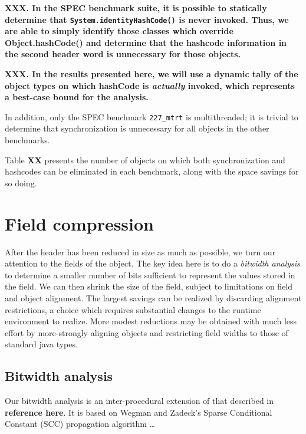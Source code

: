 \documentclass[preprint]{acmconf}
\begin{document}
{\bf XXX.  In the SPEC benchmark suite, it is possible to statically
  determine that {\tt System.identityHashCode()} is never invoked.
  Thus, we are able to simply identify those classes which override
  Object.hashCode() and determine that the hashcode information in the
  second header word is unnecessary for those objects.}

{\bf XXX. In the results presented here, we will use a dynamic tally
of the object types on which hashCode is {\it actually} invoked, which
represents a best-case bound for the analysis.}

In addition, only the SPEC benchmark {\tt 227\_mtrt} is multithreaded;
it is trivial to determine that synchronization is unnecessary for all
objects in the other benchmarks.

Table {\bf XX} presents the number of objects on which both
synchronization and hashcodes can be eliminated in each benchmark,
along with the space savings for so doing.

\section{Field compression}
After the header has been reduced in size as much as possible, we turn
our attention to the fields of the object.  The key idea here is to
do a {\it bitwidth analysis} \cite{stephenson00,ananian99:tech}
to determine a
smaller number of bits sufficient to represent the values stored in
the field.  We can then shrink the size of the field, subject to
limitations on field and object alignment.  The largest savings can be
realized by discarding alignment restrictions, a choice which requires
substantial changes to the runtime environment to realize.  More
modest reductions may be obtained with much less effort by
more-strongly aligning objects and restricting field widths to
those of standard java types.

\subsection{Bitwidth analysis}
Our bitwidth analysis is an inter-procedural extension of that
described in {\bf reference here}.  It is based on Wegman and Zadeck's
Sparse Conditional Constant (SCC) propagation algorithm
\cite{wegman91:scc}\ldots
\end{document}
